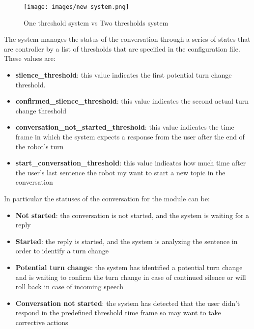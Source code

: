 \documentclass[../main.tex]{subfiles}
\begin{document}
\begin{figure}[ht]
    \centering
    \texttt{[image: images/new system.png]}
    \caption{One threshold system vs Two thresholds system}
    \label{fig:new system}
\end{figure}

The system manages the status of the conversation through a series of states that are controller by a list of thresholds that are specified in the configuration file. These values are:

\begin{itemize}
    \item \textbf{silence\_threshold}: this value indicates the first potential turn change threshold.
    \item \textbf{confirmed\_silence\_threshold}: this value indicates the second actual turn change threshold
    \item \textbf{conversation\_not\_started\_threshold}: this value indicates the time frame in which the system expects a response from the user after the end of the robot's turn
    \item \textbf{start\_conversation\_threshold}: this value indicates how much time after the user's last sentence the robot my want to start a new topic in the conversation
\end{itemize}

In particular the statuses of the conversation for the module can be:

\begin{itemize}
    \item \textbf{Not started}: the conversation is not started, and the system is waiting for a reply
    \item \textbf{Started}: the reply is started, and the system is analyzing the sentence in order to identify a turn change
    \item \textbf{Potential turn change}: the system has identified a potential turn change and is waiting to confirm the turn change in case of continued silence or will roll back in case of incoming speech
    \item \textbf{Conversation not started}: the system has detected that the user didn't respond in the predefined threshold time frame so may want to take corrective actions
\end{itemize}
\end{document}
